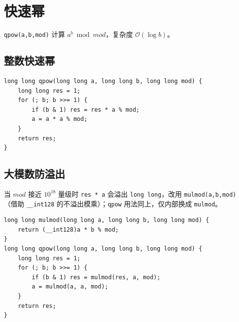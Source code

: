 \section{快速幂}

\verb|qpow(a,b,mod)| 计算 $a^b \bmod mod$，复杂度 $\mathcal{O}(\log b)$。

\subsection{整数快速幂}

\begin{lstlisting}
long long qpow(long long a, long long b, long long mod) {
    long long res = 1;
    for (; b; b >>= 1) {
        if (b & 1) res = res * a % mod;
        a = a * a % mod;
    }
    return res;
}
\end{lstlisting}

\subsection{大模数防溢出}

当 $mod$ 接近 $10^{18}$ 量级时 \texttt{res * a} 会溢出 \texttt{long long}，改用 \verb|mulmod(a,b,mod)|（借助 \texttt{\_\_int128} 的不溢出模乘）；\verb|qpow| 用法同上，仅内部换成 \verb|mulmod|。

\begin{lstlisting}
long long mulmod(long long a, long long b, long long mod) {
    return (__int128)a * b % mod;
}
long long qpow(long long a, long long b, long long mod) {
    long long res = 1;
    for (; b; b >>= 1) {
        if (b & 1) res = mulmod(res, a, mod);
        a = mulmod(a, a, mod);
    }
    return res;
}
\end{lstlisting}
